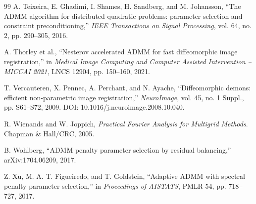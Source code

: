 \documentclass[11pt]{article}
\theoremstyle{definition}
\begin{document}
\begin{thebibliography}{99}
A. Teixeira, E. Ghadimi, I. Shames, H. Sandberg, and M. Johansson,
``The ADMM algorithm for distributed quadratic problems: parameter selection and constraint preconditioning,''
\emph{IEEE Transactions on Signal Processing}, vol. 64, no. 2, pp. 290--305, 2016.

A. Thorley et al.,
``Nesterov accelerated ADMM for fast diffeomorphic image registration,''
in \emph{Medical Image Computing and Computer Assisted Intervention -- MICCAI 2021}, LNCS 12904, pp. 150--160, 2021.

T. Vercauteren, X. Pennec, A. Perchant, and N. Ayache,
``Diffeomorphic demons: efficient non-parametric image registration,''
\emph{NeuroImage}, vol. 45, no. 1 Suppl., pp. S61--S72, 2009.
DOI: 10.1016/j.neuroimage.2008.10.040.

R. Wienands and W. Joppich,
\emph{Practical Fourier Analysis for Multigrid Methods}.
Chapman \& Hall/CRC, 2005.

B. Wohlberg,
``ADMM penalty parameter selection by residual balancing,''
arXiv:1704.06209, 2017.

Z. Xu, M. A. T. Figueiredo, and T. Goldstein,
``Adaptive ADMM with spectral penalty parameter selection,''
in \emph{Proceedings of AISTATS}, PMLR 54, pp. 718--727, 2017.
\end{thebibliography}
\end{document}
